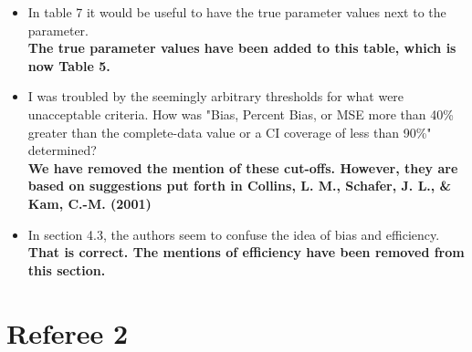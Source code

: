 \documentclass[letterpaper,12pt]{article}\usepackage[]{graphicx}\usepackage[]{color}
\begin{document}
\begin{itemize}
{There should have been two omitted responses for Day 5 in the Split Form example in Table 4.  This correction has been made.\\  
}\\

How to respond to this: ``Are these sample sizes typical? And is there good reason to believe that a different design would have produced the same results? For example, is it reasonable to assume that there are no context or order effects in these questions that might play out in at least the split form designs?"\\

\item In table 7 it would be useful to have the true parameter values next to the parameter.\\

{\bf The true parameter values have been added to this table, which is now Table 5. }\\

\item I was troubled by the seemingly arbitrary thresholds for what were unacceptable criteria. How was "Bias, Percent Bias, or MSE more than 40\% greater than the complete-data value or a CI coverage of less than 90\%" determined?\\

{\bf We have removed the mention of these cut-offs.  However, they are based on suggestions put forth in Collins, L. M., Schafer, J. L., & Kam, C.-M. (2001)}\\

\item In section 4.3, the authors seem to confuse the idea of bias and efficiency.\\

{\bf That is correct.  The mentions of efficiency have been removed from this section.  }\\

\end{itemize}

\section{Referee 2}
\end{document}
